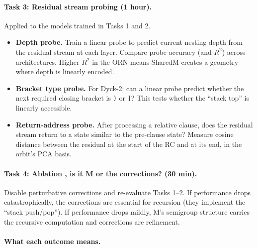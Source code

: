 \documentclass[11pt, a4paper]{article}
\theoremstyle{plain}
\theoremstyle{definition}
\theoremstyle{remark}
\begin{document}
\paragraph{Task 3: Residual stream probing (1 hour).}
Applied to the models trained in Tasks 1 and 2.

\begin{itemize}[nosep]
\item \textbf{Depth probe.} Train a linear probe to predict current nesting depth from the residual stream at each layer. Compare probe accuracy (and $R^2$) across architectures. Higher $R^2$ in the ORN means SharedM creates a geometry where depth is linearly encoded.
\item \textbf{Bracket type probe.} For Dyck-2: can a linear probe predict whether the next required closing bracket is \texttt{)} or \texttt{]}? This tests whether the ``stack top'' is linearly accessible.
\item \textbf{Return-address probe.} After processing a relative clause, does the residual stream return to a state similar to the pre-clause state? Measure cosine distance between the residual at the start of the RC and at its end, in the orbit's PCA basis.
\end{itemize}

\paragraph{Task 4: Ablation ,  is it M or the corrections? (30 min).}
Disable perturbative corrections and re-evaluate Tasks 1--2.
If performance drops catastrophically, the corrections are essential for recursion (they implement the ``stack push/pop'').
If performance drops mildly, M's semigroup structure carries the recursive computation and corrections are refinement.

\paragraph{What each outcome means.}
\end{document}
